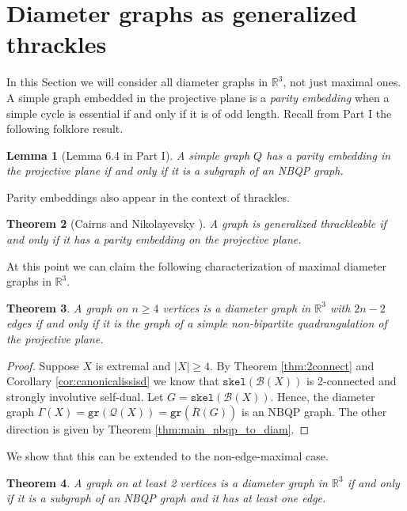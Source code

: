 \documentclass{article}
\newtheorem{theorem}{Theorem}[section]
\newtheorem{lemma}[theorem]{Lemma}
\newcommand{\R}[0]{\mathbb{R}}
\newcommand{\Bc}[0]{\mathcal{B}}
\newcommand{\skel}[0]{\mathtt{skel}}
\newcommand{\qt}{\mathcal{Q}}
\newcommand{\gr}{\mathtt{gr}}
\begin{document}
\section{Diameter graphs as generalized thrackles}\label{sec:thrackles}

In this Section we will consider all diameter graphs in $\R^3$, not just maximal ones.  A simple graph embedded in the projective plane is a \emph{parity embedding} when a simple cycle is essential if and only if it is of odd length. Recall from Part I the following folklore result.


\begin{lemma}[Lemma 6.4 in Part I]\label{lem:eqmaxcases}
    A simple graph $Q$ has a parity embedding in the projective plane if and only if it is a subgraph of an NBQP graph.
     




\end{lemma} 


Parity embeddings also appear in the context of thrackles. 

\begin{theorem}[Cairns and Nikolayevsky  \cite{CN00}]\label{thm:thrpairtyemb}
    A graph is generalized thrackleable if and only if it has a parity embedding on the projective plane.
\end{theorem}




At this point we can claim the following characterization of maximal diameter graphs in $\R^3$.

\begin{theorem}
A graph on $n\ge4$ vertices is a diameter graph in $\R^3$ with $2n-2$ edges if and only if it is the graph of a simple non-bipartite quadrangulation of the projective plane.    
\end{theorem}
\begin{proof}
    Suppose $X$ is extremal and $|X|\ge 4$. By Theorem \ref{thm:2connect} and Corollary \ref{cor:canonicalissisd} we know that $\skel(\Bc(X))$ is 2-connected and strongly involutive self-dual. Let $G=\skel(\Bc(X))$. Hence, the diameter graph $\Gamma(X)=\gr(\qt(X))=\gr(\overline{R}(G))$ is an NBQP graph. The other direction is given by Theorem \ref{thm:main_nbqp_to_diam}.
 
\end{proof}
 
We show that this can be extended to the non-edge-maximal case. 

\begin{theorem}
    A graph on at least 2 vertices is a diameter graph in $\R^3$ if and only if it is a subgraph of an NBQP graph and it has at least one edge. 
\end{theorem}
\end{document}
